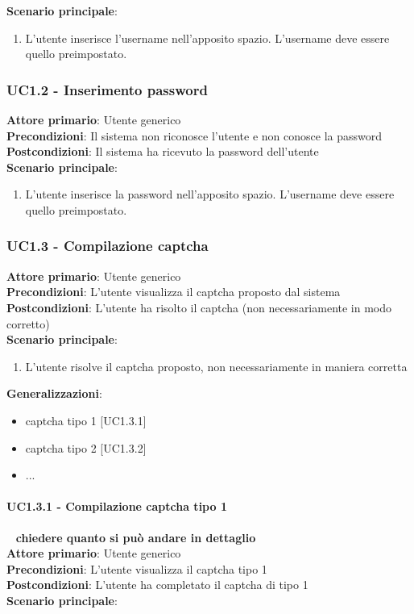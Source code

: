 \textbf{Scenario principale}:
\begin{enumerate}
   \item L'utente inserisce l'username nell'apposito spazio. L'username deve essere quello preimpostato.
\end{enumerate}

\subsubsection{UC1.2 - Inserimento password}
\textbf{Attore primario}: Utente generico\\
\textbf{Precondizioni}: Il sistema non riconosce l'utente e non conosce la password\\
\textbf{Postcondizioni}: Il sistema ha ricevuto la password dell'utente\\

\textbf{Scenario principale}:
\begin{enumerate}
   \item L'utente inserisce la password nell'apposito spazio. L'username deve essere quello preimpostato.
\end{enumerate}

\subsubsection{UC1.3 - Compilazione captcha}
\textbf{Attore primario}: Utente generico\\
\textbf{Precondizioni}: L'utente visualizza il captcha proposto dal sistema\\
\textbf{Postcondizioni}: L'utente ha risolto il captcha (non necessariamente in modo corretto)\\

\textbf{Scenario principale}:
\begin{enumerate}
   \item L'utente risolve il captcha proposto, non necessariamente in maniera corretta
\end{enumerate}
\textbf{Generalizzazioni}:
\begin{itemize}:
   \item captcha tipo 1 [UC1.3.1]
   \item captcha tipo 2 [UC1.3.2]
   \item ...
\end{itemize}

\paragraph{UC1.3.1 - Compilazione captcha tipo 1 }~\smallskip
\textbf{chiedere quanto si può andare in dettaglio}\\
\textbf{Attore primario}: Utente generico\\
\textbf{Precondizioni}: L'utente visualizza il captcha tipo 1\\
\textbf{Postcondizioni}: L'utente ha completato il captcha di tipo 1\\
\textbf{Scenario principale}:

